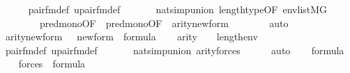 \begin{isabellebody}
\ \ \ \ \isamarkupfalse%
\ pair{\isacharunderscore}{\kern0pt}fm{\isacharunderscore}{\kern0pt}def\ upair{\isacharunderscore}{\kern0pt}fm{\isacharunderscore}{\kern0pt}def\ \isanewline
\ \ \ \ \isamarkupfalse%
\ nat{\isacharunderscore}{\kern0pt}simp{\isacharunderscore}{\kern0pt}union\ length{\isacharunderscore}{\kern0pt}type{\isacharbrackleft}{\kern0pt}OF\ {\isacartoucheopen}env{\isasymin}list{\isacharparenleft}{\kern0pt}M{\isacharbrackleft}{\kern0pt}G{\isacharbrackright}{\kern0pt}{\isacharparenright}{\kern0pt}{\isacartoucheclose}{\isacharbrackright}{\kern0pt}\ \isanewline
\ \ \ \ \ \ \ \ pred{\isacharunderscore}{\kern0pt}mono{\isacharbrackleft}{\kern0pt}OF\ {\isacharunderscore}{\kern0pt}\ pred{\isacharunderscore}{\kern0pt}mono{\isacharbrackleft}{\kern0pt}OF\ {\isacharunderscore}{\kern0pt}\ {\isacartoucheopen}arity{\isacharparenleft}{\kern0pt}{\isacharquery}{\kern0pt}new{\isacharunderscore}{\kern0pt}form{\isacharparenright}{\kern0pt}\ {\isasymle}\ {\isacharunderscore}{\kern0pt}{\isacartoucheclose}{\isacharbrackright}{\kern0pt}{\isacharbrackright}{\kern0pt}\isanewline
\ \ \ \ \isamarkupfalse%
\ auto\isanewline
\ \ \isamarkupfalse%
\ {\isacartoucheopen}arity{\isacharparenleft}{\kern0pt}{\isacharquery}{\kern0pt}new{\isacharunderscore}{\kern0pt}form{\isacharparenright}{\kern0pt}\ {\isasymle}\ {\isacharunderscore}{\kern0pt}{\isacartoucheclose}\ {\isacartoucheopen}{\isacharquery}{\kern0pt}new{\isacharunderscore}{\kern0pt}form\ {\isasymin}\ formula{\isacartoucheclose}\isanewline
\ \ \isamarkupfalse%
\ {\isachardoublequoteopen}arity{\isacharparenleft}{\kern0pt}{\isacharquery}{\kern0pt}{\isasympsi}{\isacharparenright}{\kern0pt}\ {\isasymle}\ {}\ {\isacharhash}{\kern0pt}{\isacharplus}{\kern0pt}\ length{\isacharparenleft}{\kern0pt}env{\isacharparenright}{\kern0pt}{\isachardoublequoteclose}\isanewline
\ \ \ \ \isamarkupfalse%
\ pair{\isacharunderscore}{\kern0pt}fm{\isacharunderscore}{\kern0pt}def\ upair{\isacharunderscore}{\kern0pt}fm{\isacharunderscore}{\kern0pt}def\ \isanewline
\ \ \ \ \isamarkupfalse%
\ nat{\isacharunderscore}{\kern0pt}simp{\isacharunderscore}{\kern0pt}union\ arity{\isacharunderscore}{\kern0pt}forces\isanewline
\ \ \ \ \isamarkupfalse%
\ auto\isanewline
\ \ \isamarkupfalse%
\ {\isacartoucheopen}{\isasymphi}{\isasymin}formula{\isacartoucheclose}\isanewline
\ \ \isamarkupfalse%
\ {\isachardoublequoteopen}forces{\isacharparenleft}{\kern0pt}{\isacharquery}{\kern0pt}{\isasymchi}{\isacharparenright}{\kern0pt}\ {\isasymin}\ formula{\isachardoublequoteclose}\isanewline

\end{isabellebody}
